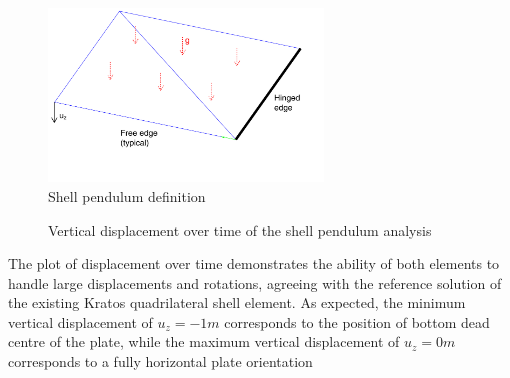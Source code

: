 \begin{figure}[H]
	\centering
	\def\svgwidth{\columnwidth}
	\includegraphics[width=7.3cm]{images/swinging_plate_problem.png}
	\caption{Shell pendulum definition}
\end{figure}
\begin{figure}[H]
	\caption{\label{ref_label_overall}Vertical displacement over time of the shell pendulum analysis}
\end{figure}

The plot of displacement over time demonstrates the ability of both elements to handle large displacements and rotations, agreeing with the reference solution of the existing Kratos quadrilateral shell element. As expected, the minimum vertical displacement of $u_z=-1m$ corresponds to the position of bottom dead centre of the plate, while the maximum vertical displacement of $u_z=0m$ corresponds to a fully horizontal plate orientation

